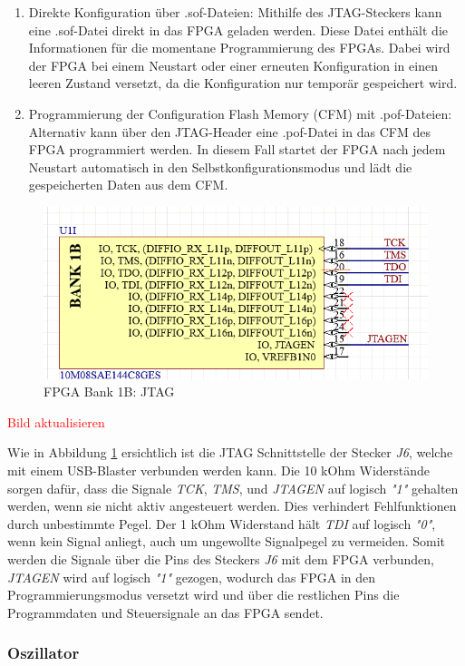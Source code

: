 \begin{enumerate}
    \item Direkte Konfiguration über .sof-Dateien:
    Mithilfe des JTAG-Steckers kann eine .sof-Datei direkt in das FPGA geladen werden. Diese Datei enthält die Informationen für die momentane Programmierung des FPGAs. Dabei wird der FPGA bei einem Neustart oder einer erneuten Konfiguration in einen leeren Zustand versetzt, da die Konfiguration nur temporär gespeichert wird.
    \item Programmierung der Configuration Flash Memory (CFM) mit .pof-Dateien: 
    Alternativ kann über den JTAG-Header eine .pof-Datei in das CFM des FPGA programmiert werden. In diesem Fall startet der FPGA nach jedem Neustart automatisch in den Selbstkonfigurationsmodus und lädt die gespeicherten Daten aus dem CFM.
\end{enumerate}

\begin{figure}[H]
    \centering
    \includegraphics[width=0.5\linewidth]{Figures/Chap3/Schematics/Bank1B_JTAG.png}
    \caption{FPGA Bank 1B: JTAG}
    \label{FPGA JTAG}
\end{figure}
\textcolor{red}{Bild aktualisieren}

Wie in Abbildung \ref{FPGA JTAG} ersichtlich ist die JTAG Schnittstelle der Stecker \textit{J6}, welche mit einem USB-Blaster verbunden werden kann. Die 10 kOhm Widerstände sorgen dafür, dass die Signale \textit{TCK}, \textit{TMS}, und \textit{JTAGEN} auf logisch \textit{"1"} gehalten werden, wenn sie nicht aktiv angesteuert werden. Dies verhindert Fehlfunktionen durch unbestimmte Pegel. Der 1 kOhm Widerstand hält \textit{TDI} auf logisch \textit{"0"}, wenn kein Signal anliegt, auch um ungewollte Signalpegel zu vermeiden. Somit werden die Signale über die Pins des Steckers \textit{J6} mit dem FPGA verbunden, \textit{JTAGEN} wird auf logisch \textit{"1"} gezogen, wodurch das FPGA in den Programmierungsmodus versetzt wird und über die restlichen Pins die Programmdaten und Steuersignale an das FPGA sendet.


\subsubsection{Oszillator}

